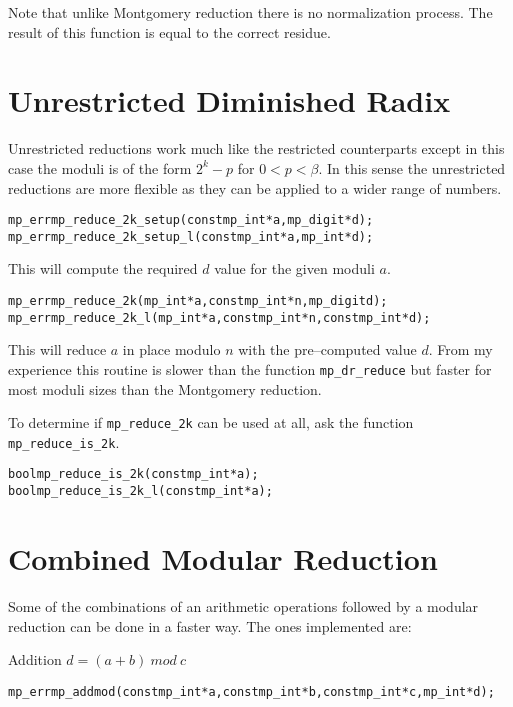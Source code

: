 \documentclass[synpaper]{book}
\def\mod{{\mathit\ mod\ }}
\begin{document}
Note that unlike Montgomery reduction there is no normalization process.  The result of this
function is equal to the correct residue.

\section{Unrestricted Diminished Radix}

Unrestricted reductions work much like the restricted counterparts except in this case the moduli
is of the form $2^k - p$ for $0 < p < \beta$. In this sense the unrestricted reductions are more
flexible as they can be applied to a wider range of numbers.

\begin{alltt}
mp_err mp_reduce_2k_setup(const mp_int *a, mp_digit *d);
mp_err mp_reduce_2k_setup_l(const mp_int *a, mp_int *d);
\end{alltt}

This will compute the required $d$ value for the given moduli $a$.

\begin{alltt}
mp_err mp_reduce_2k(mp_int *a, const mp_int *n, mp_digit d);
mp_err mp_reduce_2k_l(mp_int *a, const mp_int *n, const mp_int *d);
\end{alltt}

This will reduce $a$ in place modulo $n$ with the pre--computed value $d$.  From my experience this
routine is slower than the function \texttt{mp\_dr\_reduce} but faster for most moduli sizes than
the Montgomery reduction.

To determine if \texttt{mp\_reduce\_2k} can be used at all, ask the function
\texttt{mp\_reduce\_is\_2k}.

\begin{alltt}
bool mp_reduce_is_2k(const mp_int *a);
bool mp_reduce_is_2k_l(const mp_int *a);
\end{alltt}

\section{Combined Modular Reduction}

Some of the combinations of an arithmetic operations followed by a modular reduction can be done in
a faster way. The ones implemented are:

Addition $d = (a + b) \mod c$
\begin{alltt}
mp_err mp_addmod(const mp_int *a, const mp_int *b, const mp_int *c, mp_int *d);
\end{alltt}
\end{document}
